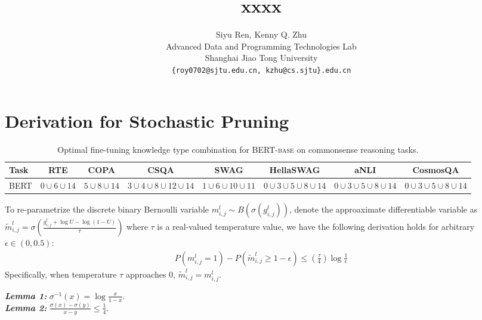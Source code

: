 \documentclass[11pt]{article}
\title{xxxx}
\author{Siyu Ren, Kenny Q. Zhu \\
	Advanced Data and Programming Technologies Lab \\
	Shanghai Jiao Tong University \\
	\texttt{\{roy0702@sjtu.edu.cn, kzhu@cs.sjtu\}.edu.cn} \\
}
\date{}
\begin{document}
\appendix
\section{Derivation for Stochastic Pruning}
\begin{table*}[tb!]
	\centering
	\scriptsize
	\begin{tabular}{l|ccccccc}
		\toprule
		\textbf{Task} & \textbf{RTE}&\textbf{COPA} &\textbf{CSQA} &\textbf{SWAG} &\textbf{HellaSWAG} &\textbf{aNLI} &\textbf{CosmosQA} \\
		\midrule
		\textsc{BERT} &$0\cup 6\cup 14$ &$5\cup 8\cup 14$ &$3\cup 4\cup 8\cup 12\cup 14$ &$1\cup 6\cup 10\cup 11$  &$0\cup 3\cup 5\cup 8\cup 14$ &$0\cup 3\cup 5\cup 8\cup 14$ &$0\cup 3\cup 5\cup 8\cup 14$ \\
		\bottomrule
	\end{tabular}
	\caption{Optimal fine-tuning knowledge type combination for \textsc{BERT-base} on commonsense reasoning tasks.}
	\label{table:finetuning}
\end{table*}
\label{ap:derivation}
To re-parametrize the discrete binary Bernoulli variable $m_{i,j}^l\sim B(\sigma(g_{i,j}^l))$, denote the approaximate differentiable variable as $\tilde{m}_{i,j}^l=\sigma(\frac{g_{i,j}^l+\log{U}-\log{(1-U)}}{\tau})$ where $\tau$ is a real-valued temperature value, we have the following derivation holds for arbitrary $\epsilon \in (0, 0.5)$:
\begin{align}
	P(m_{i,j}^l=1) - P(\tilde{m}_{i,j}^l\geq 1-\epsilon) \leq (\frac{\tau}{4})\log{\frac{1}{\epsilon}}
\end{align}
Specifically, when temperature $\tau$ approaches $0$, $\tilde{m}_{i,j}^l = m_{i,j}^l$.

\noindent
\textit{\textbf{Lemma 1:}} $\sigma^{-1}(x)=\log{\frac{x}{1-x}}$.\\
\noindent
\textit{\textbf{Lemma 2:}} $\frac{\sigma(x)-\sigma(y)}{x-y} \leq \frac{1}{4}$.
\end{document}
